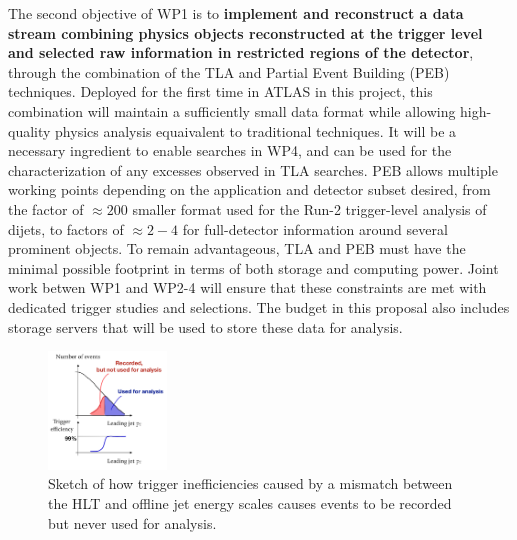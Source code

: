 The second objective of WP1 is to \textbf{implement and reconstruct a data stream combining physics objects reconstructed at the trigger level and selected raw information in restricted regions of the detector}, through the combination of the TLA and Partial Event Building (PEB) techniques. 
Deployed for the first time in ATLAS in this project, this combination will maintain a sufficiently small data format while allowing high-quality physics analysis equaivalent to traditional techniques. 
It will be a necessary ingredient to enable searches in WP4, and can be used for the characterization of any excesses observed in TLA searches. 
PEB allows multiple working points depending on the application and detector subset desired, from the factor of $\approx200$ smaller format used for the Run-2 trigger-level analysis of dijets, to factors of $\approx 2-4$ for full-detector information around several prominent objects.
\indent
To remain advantageous, TLA and PEB must have the minimal possible footprint in terms of both storage and computing power. 
Joint work betwen WP1 and WP2-4 will ensure that these constraints are met with dedicated trigger studies and selections.   
The budget in this proposal also includes storage servers that will be used to store these data for analysis. 

\begin{figure} 
\begin{center}
\includegraphics[width=0.28\textwidth]{figs_B2/efficiencySketch}
\caption{\color{black}\label{fig:wastedRate} \small Sketch of how trigger inefficiencies caused by a mismatch between the HLT and offline jet energy scales causes events to be recorded but never used for analysis.} %
\end{center}
\vskip-5pt
\end{figure}

